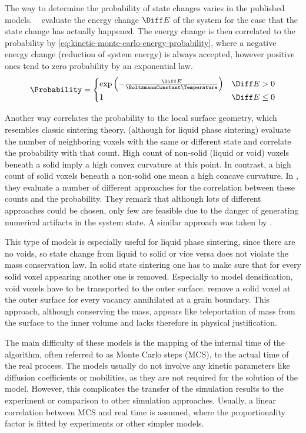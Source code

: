 The way to determine the probability of state changes varies in the published models.
\citeauthor{Tikare2003}~\cite{Braginsky2005, Tikare2003, Bjork2012, Tikare2010} evaluate the energy change $\Diff E$ of the system for the case that the state change has actually happened.
The energy change is then correlated to the probability by \cref{eq:kinetic-monte-carlo-energy-probability}, where a negative energy change (reduction of system energy) is always accepted, however positive ones tend to zero probability by an exponential law.
\begin{equation}
    \Probability =
    \begin{cases}
        \exp \left( -\frac{\Diff E}{\BoltzmannConstant \Temperature} \right) & \Diff E > 0 \\
        1 & \Diff E \le 0
    \end{cases}
    \label{eq:kinetic-monte-carlo-energy-probability}
\end{equation}

Another way correlates the probability to the local surface geometry, which resembles classic sintering theory.
\textcite{Luque2010} (although for liquid phase sintering) evaluate the number of neighboring voxels with the same or different state and correlate the probability with that count.
High count of non-solid (liquid or void) voxels beneath a solid imply a high convex curvature at this point.
In contrast, a high count of solid voxels beneath a non-solid one mean a high concave curvature.
In \textcite{Luque2005}, they evaluate a number of different approaches for the correlation between these counts and the probability.
They remark that although lots of different approaches could be chosen, only few are feasible due to the danger of generating numerical artifacts in the system state.
A similar approach was taken by \textcite{Wang2018}.

This type of models is especially useful for liquid phase sintering, since there are no voids, so state change from liquid to solid or vice versa does not violate the mass conservation law.
In solid state sintering one has to make sure that for every solid voxel appearing another one is removed.
Especially to model densification, void voxels have to be transported to the outer surface.
\textcite{Braginsky2005} remove a solid voxel at the outer surface for every vacancy annihilated at a grain boundary.
This approach, although conserving the mass, appears like teleportation of mass from the surface to the inner volume and lacks therefore in physical justification.

The main difficulty of these models is the mapping of the internal time of the algorithm, often referred to as Monte Carlo steps (MCS), to the actual time of the real process.
The models usually do not involve any kinetic parameters like diffusion coefficients or mobilities, as they are not required for the solution of the model.
However, this complicates the transfer of the simulation results to the experiment or comparison to other simulation approaches.
Usually, a linear correlation between MCS and real time is assumed, where the proportionality factor is fitted by experiments or other simpler models.
